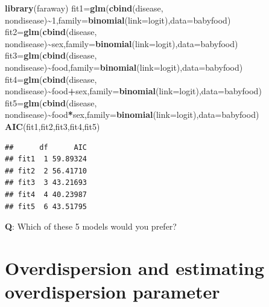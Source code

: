 \documentclass[
]{article}
\newenvironment{Shaded}{\begin{snugshade}}{\end{snugshade}}
\newcommand{\AttributeTok}[1]{\textcolor[rgb]{0.13,0.29,0.53}{#1}}
\newcommand{\DecValTok}[1]{\textcolor[rgb]{0.00,0.00,0.81}{#1}}
\newcommand{\FunctionTok}[1]{\textcolor[rgb]{0.13,0.29,0.53}{\textbf{#1}}}
\newcommand{\NormalTok}[1]{#1}
\newcommand{\OtherTok}[1]{\textcolor[rgb]{0.56,0.35,0.01}{#1}}
\newcommand{\SpecialCharTok}[1]{\textcolor[rgb]{0.81,0.36,0.00}{\textbf{#1}}}
\begin{document}
\begin{Shaded}
\begin{Highlighting}[]
\FunctionTok{library}\NormalTok{(faraway)}
\NormalTok{fit1}\OtherTok{=}\FunctionTok{glm}\NormalTok{(}\FunctionTok{cbind}\NormalTok{(disease, nondisease)}\SpecialCharTok{\textasciitilde{}}\DecValTok{1}\NormalTok{,}\AttributeTok{family=}\FunctionTok{binomial}\NormalTok{(}\AttributeTok{link=}\NormalTok{logit),}\AttributeTok{data=}\NormalTok{babyfood)}
\NormalTok{fit2}\OtherTok{=}\FunctionTok{glm}\NormalTok{(}\FunctionTok{cbind}\NormalTok{(disease, nondisease)}\SpecialCharTok{\textasciitilde{}}\NormalTok{sex,}\AttributeTok{family=}\FunctionTok{binomial}\NormalTok{(}\AttributeTok{link=}\NormalTok{logit),}\AttributeTok{data=}\NormalTok{babyfood)}
\NormalTok{fit3}\OtherTok{=}\FunctionTok{glm}\NormalTok{(}\FunctionTok{cbind}\NormalTok{(disease, nondisease)}\SpecialCharTok{\textasciitilde{}}\NormalTok{food,}\AttributeTok{family=}\FunctionTok{binomial}\NormalTok{(}\AttributeTok{link=}\NormalTok{logit),}\AttributeTok{data=}\NormalTok{babyfood)}
\NormalTok{fit4}\OtherTok{=}\FunctionTok{glm}\NormalTok{(}\FunctionTok{cbind}\NormalTok{(disease, nondisease)}\SpecialCharTok{\textasciitilde{}}\NormalTok{food}\SpecialCharTok{+}\NormalTok{sex,}\AttributeTok{family=}\FunctionTok{binomial}\NormalTok{(}\AttributeTok{link=}\NormalTok{logit),}\AttributeTok{data=}\NormalTok{babyfood)}
\NormalTok{fit5}\OtherTok{=}\FunctionTok{glm}\NormalTok{(}\FunctionTok{cbind}\NormalTok{(disease, nondisease)}\SpecialCharTok{\textasciitilde{}}\NormalTok{food}\SpecialCharTok{*}\NormalTok{sex,}\AttributeTok{family=}\FunctionTok{binomial}\NormalTok{(}\AttributeTok{link=}\NormalTok{logit),}\AttributeTok{data=}\NormalTok{babyfood)}
\FunctionTok{AIC}\NormalTok{(fit1,fit2,fit3,fit4,fit5)}
\end{Highlighting}
\end{Shaded}

\begin{verbatim}
##      df      AIC
## fit1  1 59.89324
## fit2  2 56.41710
## fit3  3 43.21693
## fit4  4 40.23987
## fit5  6 43.51795
\end{verbatim}

\normalsize

\textbf{Q}: Which of these 5 models would you prefer?

\hypertarget{overdispersion-and-estimating-overdispersion-parameter}{%
\section{Overdispersion and estimating overdispersion
parameter}\label{overdispersion-and-estimating-overdispersion-parameter}}
\end{document}

